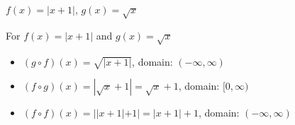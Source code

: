 {$f(x) = |x+1|$, $g(x) = \sqrt{x}$}
{For   $f(x) = |x+1|$ and $g(x) = \sqrt{x}$

\begin{itemize}

\item  $(g \circ f)(x) = \sqrt{|x+1|}$, domain: $(-\infty, \infty)$

\item  $(f \circ g)(x) = |\sqrt{x}+1| = \sqrt{x}+1$, domain: $[0,\infty)$

\item  $(f \circ f)(x) = ||x+1|+1| = |x+1|+1$, domain: $(-\infty, \infty)$

\end{itemize}}
